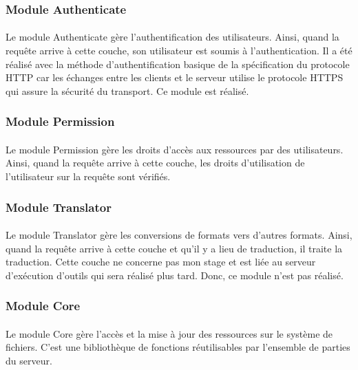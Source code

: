 \documentclass{report}
\begin{document}
\subsubsection{Module Authenticate}

\paragraph{} 
Le module Authenticate gère l'authentification des utilisateurs. Ainsi, quand la requête arrive à cette couche, son
utilisateur est soumis à l'authentication. Il a été réalisé avec la méthode d'authentification basique de la spécification
du protocole HTTP car les échanges entre les clients et le serveur utilise le protocole HTTPS qui assure la sécurité
du transport. Ce module est réalisé.

\subsubsection{Module Permission}

\paragraph{} 
Le module Permission gère les droits d'accès aux ressources par des utilisateurs. Ainsi, quand la requête arrive
à cette couche, les droits d'utilisation de l'utilisateur sur la requête sont vérifiés. 

\subsubsection{Module Translator}

\paragraph{} 
Le module Translator gère les conversions de formats vers d'autres formats. Ainsi, quand la requête arrive
à cette couche et qu'il y a lieu de traduction, il traite la traduction. Cette couche ne concerne pas
mon stage et est liée au serveur d'exécution d'outils qui sera réalisé plus tard. Donc, ce module n'est pas réalisé.

\subsubsection{Module Core}

\paragraph{}
Le module Core gère l'accès et la mise à jour des ressources sur le système de fichiers. C'est une bibliothèque de 
fonctions réutilisables par l'ensemble de parties du serveur.
\end{document}
